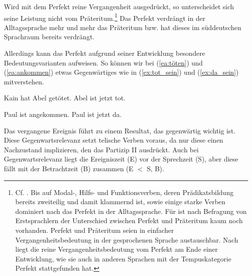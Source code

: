 Wird mit dem Perfekt reine Vergangenheit ausgedrückt, so unterscheidet sich seine Leistung nicht vom Präteritum.\footnote{Cf. \citet[273--274]{Leiss1992}. Bis auf Modal-, Hilfs- und Funktionsverben, deren Prädikatsbildung bereits zweiteilig und damit klammernd ist, sowie einige starke Verben dominiert nach \citet[94]{Sieberg1984} das Perfekt in der Alltagssprache. Für \citet[31, 77]{Hennig2000} ist nach Befragung von Erstsprachlern der Unterschied zwischen Perfekt und Präteritum  kaum noch vorhanden. Perfekt und Präteritum seien in einfacher Vergangenheitsbedeutung in der gesprochenen Sprache austauschbar. Nach \citet[4]{LitvinovNedjalkov1988} liegt die reine Vergangenheitsbedeutung vom Perfekt am Ende einer Entwicklung, wie sie auch in anderen Sprachen mit der Tempuskategorie Perfekt stattgefunden hat.} Das Perfekt verdrängt in der Alltagssprache mehr und mehr das Präteritum bzw. hat dieses im süddeutschen Sprachraum bereits verdrängt.

Allerdings kann das Perfekt aufgrund seiner Entwicklung besondere Bedeutungsvarianten aufweisen. So können wir bei (\ref{ea:töten}) und (\ref{ea:ankommen}) etwas Gegenwärtiges wie in (\ref{ex:tot_sein}) und (\ref{ex:da_sein}) mitverstehen.

\ea \label{ea:Perf_Präsentisch_haben}
\ea \label{ea:töten} Kain hat Abel getötet.
\ex \label{ex:tot_sein} Abel ist jetzt tot.
\z 
\z 

\ea \label{ea:Perf_Präsentisch_sein}
\ea \label{ea:ankommen} Paul ist angekommen.
\ex \label{ex:da_sein} Paul ist jetzt da.
\z 
\z

Das vergangene Ereignis führt zu einem Resultat, das gegenwärtig wichtig ist. Diese Gegenwartsrelevanz setzt telische Verben voraus, da nur diese einen Nachzustand implizieren, den das Partizip II ausdrückt. Auch bei Gegenwartsrelevanz liegt die Ereigniszeit (E) vor der Sprechzeit (S), aber diese fällt mit der Betrachtzeit (B) zusammen (E $<$ S, B).

